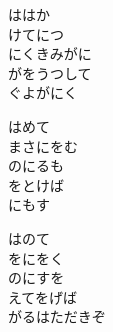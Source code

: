 \documentclass[10pt,b5j]{tarticle} %
\begin{document}
\begin{enumerate}
\begin{minipage}[c]{\blocksize}
        \vspace{\linespace}
        \item
        ははか\\
        けてにつ\\
        にくきみがに\\
        がをうつして\\
        ぐよがにく
        
        \vspace{\linespace}
        \item
        はめて\\
        まさにをむ\\
        のにるも\\
        をとけば\\
        にもす
        
        \vspace{\linespace}
        \item
        はのて\\
        をにをく\\
        のにすを\\
        えてをげば\\
        がるはただきぞ
    
    \end{minipage}
\end{enumerate} %
\end{document}
